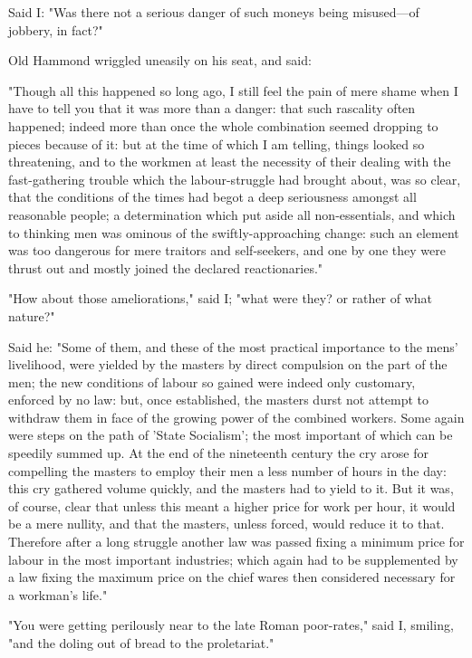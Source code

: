 Said I: "Was there not a serious danger of such moneys being
misused---of jobbery, in fact?"

Old Hammond wriggled uneasily on his seat, and said:

"Though all this happened so long ago, I still feel the pain of mere
shame when I have to tell you that it was more than a danger: that such
rascality often happened; indeed more than once the whole combination
seemed dropping to pieces because of it: but at the time of which I am
telling, things looked so threatening, and to the workmen at least the
necessity of their dealing with the fast-gathering trouble which the
labour-struggle had brought about, was so clear, that the conditions of
the times had begot a deep seriousness amongst all reasonable people; a
determination which put aside all non-essentials, and which to thinking
men was ominous of the swiftly-approaching change: such an element was
too dangerous for mere traitors and self-seekers, and one by one they
were thrust out and mostly joined the declared reactionaries."

"How about those ameliorations," said I; "what were they? or rather of
what nature?"

Said he: "Some of them, and these of the most practical importance to
the mens' livelihood, were yielded by the masters by direct compulsion
on the part of the men; the new conditions of labour so gained were
indeed only customary, enforced by no law: but, once established, the
masters durst not attempt to withdraw them in face of the growing power
of the combined workers. Some again were steps on the path of 'State
Socialism'; the most important of which can be speedily summed up. At
the end of the nineteenth century the cry arose for compelling the
masters to employ their men a less number of hours in the day: this cry
gathered volume quickly, and the masters had to yield to it. But it was,
of course, clear that unless this meant a higher price for work per
hour, it would be a mere nullity, and that the masters, unless forced,
would reduce it to that. Therefore after a long struggle another law was
passed fixing a minimum price for labour in the most important
industries; which again had to be supplemented by a law fixing the
maximum price on the chief wares then considered necessary for a
workman's life."

"You were getting perilously near to the late Roman poor-rates," said I,
smiling, "and the doling out of bread to the proletariat."

